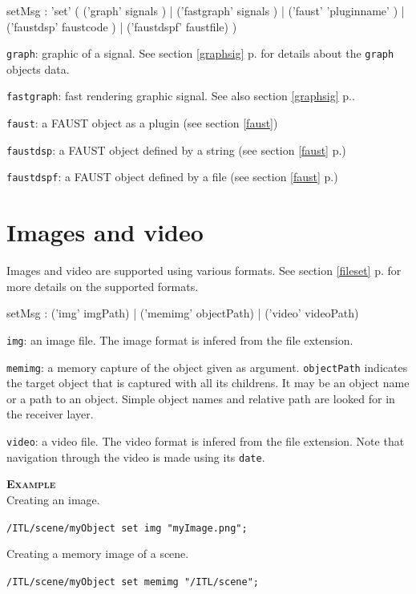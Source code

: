 \documentclass[a4paper,twoside]{report}
\newcommand{\sublevel}[1]	{\section{#1}}
\newcommand{\fullref}[1]	{\ref{#1} p.\pageref{#1}}
\newcommand{\OSC}[1]		{\texttt{#1}}
\newcommand{\example}		{\textbf{\hspace{-1.5cm}\textbf{\textsc{Example }}}}
\let\olditemize\itemize
\let\oldenditemize\enditemize
\renewenvironment{itemize} 	{\olditemize \setlength{\itemsep}{1mm}}{\oldenditemize}
\newcommand{\sample}	[1]			{\vspace{-2mm}\begin{center}\colorbox{mygrey}{
								\begin{minipage}[t]{0.9\columnwidth} 
								{\small \texttt{#1}}
								\end{minipage}}\end{center}}
\begin{document}
\begin{rail}
setMsg : 'set' (
	('graph' signals ) |
	('fastgraph' signals ) |
	('faust' 'pluginname' ) |
	('faustdsp' faustcode ) |
	('faustdspf' faustfile)
)
\end{rail}

\begin{itemize}
\item \OSC{graph}: graphic of a signal. See section \fullref{graphsig} for details about the \OSC{graph} objects data.
\item \OSC{fastgraph}: fast rendering graphic signal. See also section \fullref{graphsig}.
\item \OSC{faust}: a FAUST object as a plugin (see section \ref{faust})
\item \OSC{faustdsp}: a FAUST object defined by a string (see section \fullref{faust})
\item \OSC{faustdspf}: a FAUST object defined by a file (see section \fullref{faust})
\end{itemize}


\sublevel{Images and video}
\label{imgscore}

Images and video are supported using various formats. See section \fullref{fileset} for more details on the supported formats.

\begin{rail}
setMsg : 
	('img' imgPath) |
	('memimg' objectPath) |
	('video' videoPath)
\end{rail}

\begin{itemize}
\item \OSC{img}: an image file. The image format is infered from the file extension.
\item \OSC{memimg}: a memory capture of the object given as argument. \OSC{objectPath} indicates the target object that is captured with all its childrens. It may be an object name or a path to an object. Simple object names and relative path are looked for in the receiver layer.
\item \OSC{video}: a video file. The video format is infered from the file extension. Note that navigation through the video is made using its \OSC{date}.
\end{itemize}

\example \\
Creating an image.
\sample{/ITL/scene/myObject set img "myImage.png";}
Creating a memory image of a scene.
\sample{/ITL/scene/myObject set memimg "/ITL/scene";}
\end{document}
